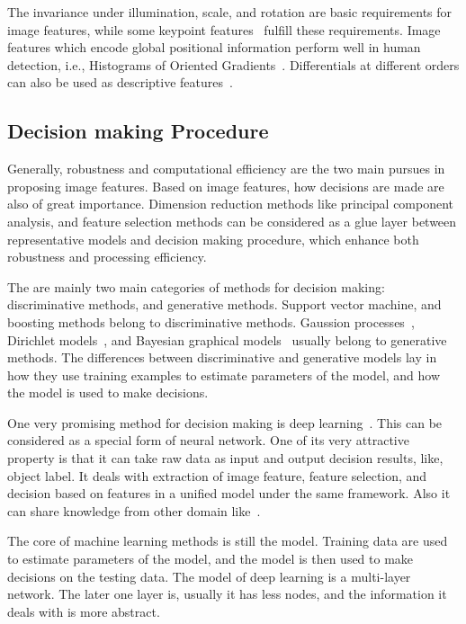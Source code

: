 The invariance under illumination, scale, and rotation are basic requirements for image features, while some keypoint features~\citep{ij2,o12,o14,o15,o2} fulfill these requirements. Image features which encode global positional information perform well in human detection, i.e., Histograms of Oriented
Gradients~\citep{ij4}. Differentials at different orders can also be used as descriptive features~\citep{regionc}.



\subsection{Decision making Procedure}
Generally, robustness and computational efficiency are the two main pursues in proposing image features. Based on image features, how decisions are made are also of great importance. Dimension reduction methods like principal component analysis, and feature selection methods can be considered as a glue layer between representative models and decision making procedure, which enhance both robustness and processing efficiency.

The are mainly two main categories of methods for decision making: discriminative methods, and generative methods.
Support vector machine, and boosting methods belong to discriminative methods. Gaussion processes~\citep{gprocess}, Dirichlet models~\citep{lda,dp,hdp}, and Bayesian graphical models~\citep{bgm} usually belong to generative methods. The differences between discriminative and generative models lay in how they use training examples to estimate parameters of the model, and how the model is used to make decisions.

One very promising method for decision making is deep learning~\citep{dlearn}. This can be considered as a special form of neural network. One of its very attractive property is that it can take raw data as input and output decision results, like, object label. It deals with extraction of image feature, feature selection, and decision based on features in a unified model under the same framework. Also it can share knowledge from other domain like~\citep{tlsurvey}.

The core of machine learning methods is still the model. Training data are used to estimate  parameters of the model, and the model is then used to make decisions on the testing data. The model of deep learning is a multi-layer network. The later one layer is, usually it has less nodes, and the information it deals with is more abstract.

